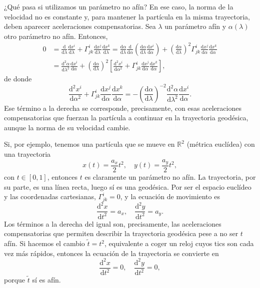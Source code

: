 ¿Qué pasa si utilizamos un parámetro no afín? En ese caso, la norma de la velocidad no es constante y, para mantener la partícula en la misma trayectoria, deben aparecer aceleraciones compensatorias. Sea \(\lambda\) un parámetro afín y \(\alpha(\lambda)\) otro parámetro no afín. Entonces, 
\begin{align*}
    0 &= \frac{\mathrm{d}}{\mathrm{d}\lambda}\frac{\mathrm{d}x^i}{\mathrm{d}\lambda} + \Gamma^{i}_{jk}\frac{\mathrm{d}x^j}{\mathrm{d}\lambda}\frac{\mathrm{d}x^k}{\mathrm{d}\lambda} = \frac{\mathrm{d}\alpha}{\mathrm{d}\lambda}\frac{\mathrm{d}}{\mathrm{d}\alpha} \left(\frac{\mathrm{d}\alpha}{\mathrm{d}\lambda} \frac{\mathrm{d}x^i}{\mathrm{d}\alpha} \right) + \left(\frac{\mathrm{d}\alpha}{\mathrm{d}\lambda}\right)^2\Gamma^{i}_{jk}\frac{\mathrm{d}x^j}{\mathrm{d}\alpha}\frac{\mathrm{d}x^k}{\mathrm{d}\alpha}\\
    &= \frac{\mathrm{d}^2\alpha}{\mathrm{d}\lambda^2}\frac{\mathrm{d}x^i}{\mathrm{d}\alpha} + 
    \left(\frac{\mathrm{d}\alpha}{\mathrm{d}\lambda}\right)^2 \left[\frac{\mathrm{d}^2x^i}{\mathrm{d}\alpha^2} + \Gamma^{i}_{jk}\frac{\mathrm{d}x^j}{\mathrm{d}\alpha}\frac{\mathrm{d}x^k}{\mathrm{d}\alpha} \right],
\end{align*}
de donde
\begin{equation}
    \label{eq.4-geodesica_parametro-no-afín}
    \frac{\mathrm{d}^2x^i}{\mathrm{d}\alpha^2} + \Gamma^{i}_{jk}\frac{\mathrm{d}x^j}{\mathrm{d}\alpha}\frac{\mathrm{d}x^k}{\mathrm{d}\alpha} = -\left(\frac{\mathrm{d}\alpha}{\mathrm{d}\lambda}\right)^{-2}\frac{\mathrm{d}^2\alpha}{\mathrm{d}\lambda^2}\frac{\mathrm{d}x^i}{\mathrm{d}\alpha}.
\end{equation}
Ese término a la derecha se corresponde, precisamente, con esas aceleraciones compensatorias que fuerzan la partícula a continuar en la trayectoria geodésica, aunque la norma de su velocidad cambie. 

Si, por ejemplo, tenemos una partícula que se mueve en \(\mathbb{R}^2\) (métrica euclídea) con una trayectoria
\begin{equation}
    x(t) = \frac{a_x}{2}t^2, \quad y(t) = \frac{a_y}{2}t^2,
\end{equation}
con \(t \in [0, 1]\), entonces \(t\) es claramente un parámetro no afín. La trayectoria, por su parte, es una línea recta, luego sí es una geodésica. Por ser el espacio euclídeo y las coordenadas cartesianas, \(\Gamma^i_{jk} = 0\), y la ecuación de movimiento es
\begin{equation}
    \frac{\mathrm{d}^2x}{\mathrm{d}t^2} = a_x,\quad\frac{\mathrm{d}^2y}{\mathrm{d}t^2} = a_y.
\end{equation}
Los términos a la derecha del igual son, precisamente, las aceleraciones compensatorias que permiten describir la trayectoria geodésica pese a no ser \(t\) afín. Si hacemos el cambio \(\tilde{t} = t^2\), equivalente a coger un reloj cuyos tics son cada vez más rápidos, entonces la ecuación de la trayectoria se convierte en 
\begin{equation}
    \frac{\mathrm{d}^2x}{\mathrm{d}t^2} = 0,\quad\frac{\mathrm{d}^2y}{\mathrm{d}t^2} = 0,
\end{equation}
porque \(\tilde{t}\) sí es afín.

